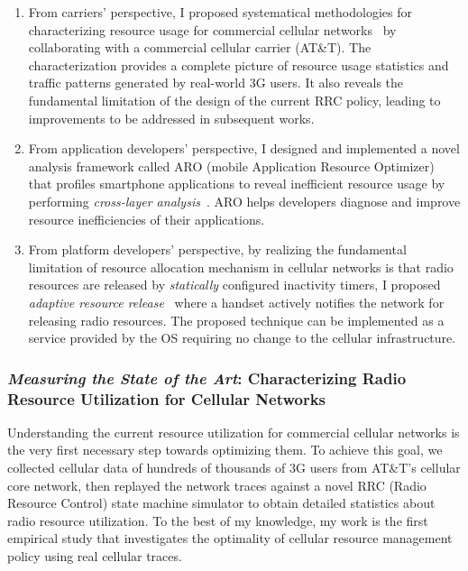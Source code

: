 \documentclass[10pt]{article}
\begin{document}
\begin{small}

\begin{enumerate}
  \item From carriers' perspective, I proposed systematical methodologies for characterizing resource usage for commercial cellular networks~\cite{qian10_imc, qian11_periodic} by collaborating with a commercial cellular carrier (AT\&T). The characterization provides a complete picture of resource usage statistics and traffic patterns generated by real-world 3G users. It also reveals the fundamental limitation of the design of the current RRC policy, leading to improvements to be addressed in subsequent works.
  \item From application developers' perspective, I designed and implemented a novel analysis framework called ARO (mobile Application Resource Optimizer) that profiles smartphone applications to reveal inefficient resource usage by performing \emph{cross-layer analysis}~\cite{qian11_mobisys}. ARO helps developers diagnose and improve resource inefficiencies of their applications.
  \item From platform developers' perspective, by realizing the fundamental limitation of resource allocation mechanism in cellular networks is that radio resources are released by \emph{statically} configured inactivity timers, I proposed \emph{adaptive resource release}~\cite{qian10_icnp} where a handset actively notifies the network for releasing radio resources.
      The proposed technique can be implemented as a service provided by the OS requiring no change to the cellular infrastructure.
\end{enumerate}
\fi

\subsubsection*{\emph{Measuring the State of the Art}: Characterizing Radio Resource Utilization for Cellular Networks}


Understanding the current resource utilization for commercial cellular networks is the very first necessary step towards optimizing them.
To achieve this goal, we collected cellular data of hundreds of thousands of 3G users from AT\&T's cellular core network, then replayed the network traces against a novel RRC (Radio Resource Control) state machine simulator to obtain detailed statistics about radio resource utilization. To the best of my knowledge, my work is the first empirical study that investigates the optimality of cellular resource management policy using real cellular traces.


\end{small}
\end{document}
